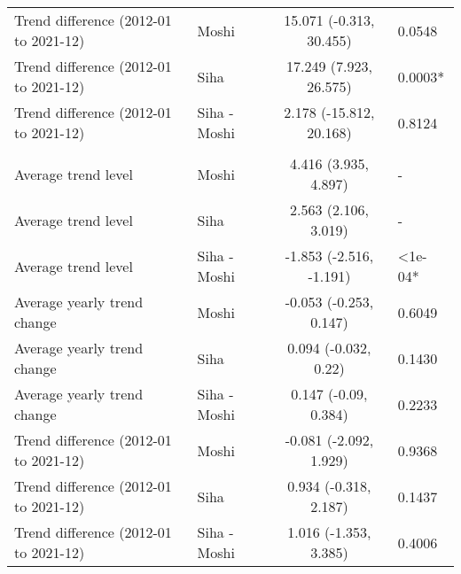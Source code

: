 \begin{longtable}{l|lcl}
Trend difference (2012-01 to 2021-12) & Moshi & 15.071 (-0.313, 30.455) & 0.0548 \\ 
Trend difference (2012-01 to 2021-12) & Siha & 17.249 (7.923, 26.575) & 0.0003* \\ 
Trend difference (2012-01 to 2021-12) & Siha - Moshi & 2.178 (-15.812, 20.168) & 0.8124 \\ 
\midrule\addlinespace[2.5pt]
\multicolumn{4}{l}{No. rain days } \\[2.5pt] 
\midrule\addlinespace[2.5pt]
Average trend level & Moshi & 4.416 (3.935, 4.897) & - \\ 
Average trend level & Siha & 2.563 (2.106, 3.019) & - \\ 
Average trend level & Siha - Moshi & -1.853 (-2.516, -1.191) & <1e-04* \\ 
Average yearly trend change & Moshi & -0.053 (-0.253, 0.147) & 0.6049 \\ 
Average yearly trend change & Siha & 0.094 (-0.032, 0.22) & 0.1430 \\ 
Average yearly trend change & Siha - Moshi & 0.147 (-0.09, 0.384) & 0.2233 \\ 
Trend difference (2012-01 to 2021-12) & Moshi & -0.081 (-2.092, 1.929) & 0.9368 \\ 
Trend difference (2012-01 to 2021-12) & Siha & 0.934 (-0.318, 2.187) & 0.1437 \\ 
Trend difference (2012-01 to 2021-12) & Siha - Moshi & 1.016 (-1.353, 3.385) & 0.4006 \\ 
\bottomrule
\end{longtable}
\endgroup

